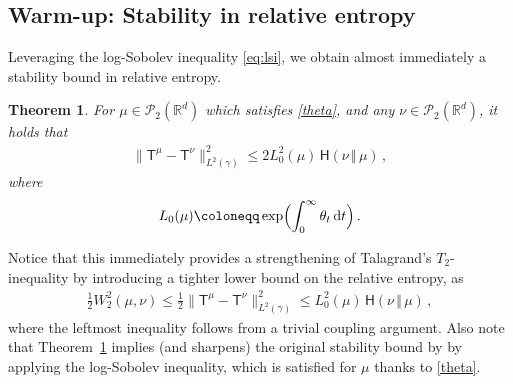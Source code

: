 \documentclass[12pt]{article}
\newcommand{\cP}{\mathcal{P}}
\newcommand{\1}{\mathds{1}}
\newcommand*{\rd}{\mathrm{d}}
\newcommand*{\dd}{\, \rd}
\newcommand{\mmid}{\,\Vert\,}
\newcommand{\deq}{\coloneqq}
\renewcommand{\leq}{\leqslant}
\theoremstyle{plain}
\newtheorem{theorem}{Theorem}[section]
\theoremstyle{definition}
\theoremstyle{remark}
\begin{document}
\subsection{Warm-up: Stability in relative entropy}
Leveraging the log-Sobolev inequality \eqref{eq:lsi}, we obtain almost immediately a stability bound in relative entropy.

\begin{theorem}\label{thm:stab_ent}
For $\mu \in \cP_2(\mathbb{R}^d)$ which satisfies \eqref{theta}, and any $\nu \in \cP_2(\mathbb{R}^d)$, it holds that
\begin{align}\label{eq:ent_stab_bd}
\|\mathsf T^{\mu} - \mathsf T^{\nu}\|_{L^2(\gamma)}^2 \leq 2L_0^2(\mu) \, {\mathsf H}(\nu\mmid\mu)\,,
\end{align}
where $$L_0(\mu) \deq \exp\Bigl(\int_0^\infty \theta_t \dd t\Bigr)\, .$$
\end{theorem}

Notice that this immediately provides a strengthening of Talagrand's $T_2$-inequality by introducing a tighter lower bound on the relative entropy, as
\begin{align*}
    \tfrac{1}{2}W_2^2(\mu,\nu) \leq \tfrac12 \|\mathsf T^{\mu} - \mathsf T^{\nu}\|_{L^2(\gamma)}^2 \leq L_{0}^2(\mu) \, {\mathsf H}(\nu\mmid\mu)\,,
\end{align*}
where the leftmost inequality follows from a trivial coupling argument. Also note that Theorem~\ref{thm:stab_ent} implies (and sharpens) the original stability bound by \cite{chewi2025stability} by applying the log-Sobolev inequality, which is satisfied for $\mu$ thanks to \eqref{theta}. 
\end{document}
